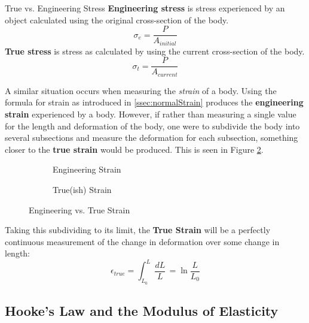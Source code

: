 \documentclass[12pt]{article}
\begin{document}
\begin{definition}{True vs. Engineering Stress}
  \textbf{Engineering stress} is stress experienced by an object calculated using the original cross-section of the body.
  \begin{equation*}
  \sigma_e = \frac{P}{A_{initial}}
  \end{equation*}
  \textbf{True stress} is stress as calculated by using the current cross-section of the body.
  \begin{equation*}
    \sigma_t = \frac{P}{A_{current}}
  \end{equation*}
\end{definition}

A similar situation occurs when measuring the \textit{strain} of a body. Using the formula for strain as introduced in \ref{ssec:normalStrain} produces the \textbf{engineering strain} experienced by a body. However, if rather than measuring a single value for the length and deformation of the body, one were to subdivide the body into several subsections and measure the deformation for each subsection, something closer to the \textbf{true strain} would be produced. This is seen in Figure \ref{fig:019}.

\begin{figure}[H]
  \centering
  \begin{subfigure}[H]{0.45\textwidth}
    \centering
    
    \caption{Engineering Strain}
    \label{fig:020}
  \end{subfigure}
  \begin{subfigure}[H]{0.45\textwidth}
    \centering
    
    \caption{True(ish) Strain}
    \label{fig:019}
  \end{subfigure}
  \caption{Engineering vs. True Strain}
  \label{fig:engineeringVsTrueStrain}
\end{figure}

Taking this subdividing to its limit, the \textbf{True Strain} will be a perfectly continuous measurement of the change in deformation over some change in length:
\begin{equation*}
  \epsilon_{true} = \int_{L_0}^{L} \frac{dL}{L} \, = \ln \frac{L}{L_0}
\end{equation*}

\subsection{Hooke's Law and the Modulus of Elasticity}
\label{ssec:HookesLawAndTheModulusOfElasticity}
\end{document}
